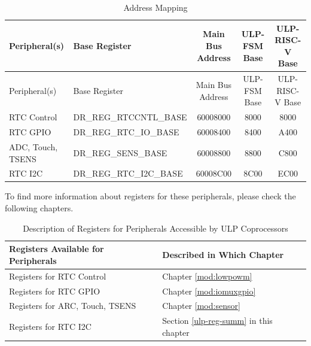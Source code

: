 \documentclass[main\_\_EN.tex]{subfiles}
\begin{document}
\begin{longtable}[c]{ |p{3.2cm}|p{4cm}|c|c|c| }
    \caption{Address Mapping}
    \label{tab: address-mapping}
    \\\hline
    \rowcolor{lightgray}
    \textbf{Peripheral(s)} & \textbf{Base Register} & \textbf{Main Bus Address} & \textbf{ULP-FSM Base} & \textbf{ULP-RISC-V Base} \\\hline
    \endfirsthead
    \hline
    \rowcolor{lightgray}
    Peripheral(s) & Base Register & Main Bus Address & ULP-FSM Base & ULP-RISC-V Base\\\hline
    \endhead
    \hline
    \endfoot
   RTC Control & DR\_REG\_RTCCNTL\_BASE & \hexprefix{}60008000 & \hexprefix{}8000 & \hexprefix{}8000 \\\hline
   RTC GPIO & DR\_REG\_RTC\_IO\_BASE & \hexprefix{}60008400 &\hexprefix{}8400 & \hexprefix{}A400 \\\hline
   ADC, Touch, TSENS & DR\_REG\_SENS\_BASE & \hexprefix{}60008800 & \hexprefix{}8800& \hexprefix{}C800\\\hline
   RTC I2C & DR\_REG\_RTC\_I2C\_BASE & \hexprefix{}60008C00 & \hexprefix{}8C00 & \hexprefix{}EC00 \\\hline
\end{longtable}

To find more information about registers for these peripherals, please check the following chapters.


\begin{table}[H]
    \centering
    \caption{Description of Registers for Peripherals Accessible by ULP Coprocessors}\label{RF Standards}

    \begin{threeparttable}
    \begin{tabular}[c]{|p{6cm}|p{10cm}|}
    \hline
        \rowcolor{lightgray}
\textbf{Registers Available for Peripherals} & \textbf{Described in Which Chapter} \\\hline
Registers for RTC Control & Chapter \ref{mod:lowpowm} \textit{\nameref{mod:lowpowm}} \\\hline
Registers for RTC GPIO & Chapter \ref{mod:iomuxgpio} \textit{\nameref{mod:iomuxgpio}} \\\hline
Registers for ARC, Touch, TSENS& Chapter \ref{mod:sensor} \textit{\nameref{mod:sensor}} \\\hline
Registers for RTC I2C & Section \ref{ulp-reg-summ} \textit{\nameref{ulp-reg-summ}} in this chapter \\\hline
\end{tabular}
     \end{threeparttable}
    \end{table}
\end{document}
